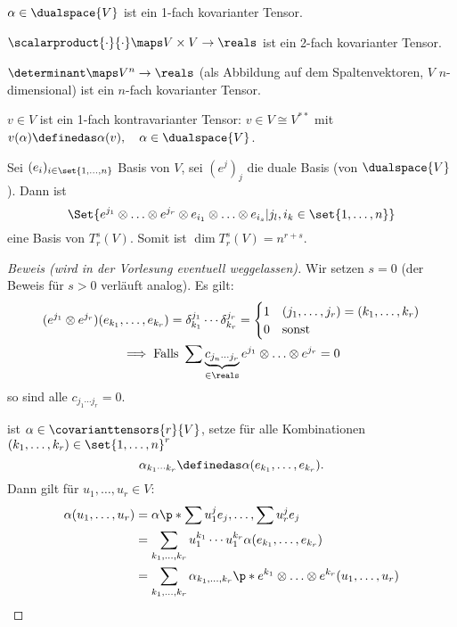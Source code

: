 \begin{beispiel*}
\( \alpha\in \dualspace{V} \) ist ein 1-fach kovarianter Tensor.

\( \scalarproduct{\cdot}{\cdot}\maps V\times V\to\reals \) ist ein 2-fach kovarianter Tensor.

\( \determinant\maps V^n\to\reals \) (als Abbildung auf dem Spaltenvektoren, \( V \) \( n \)-dimensional) ist ein \( n \)-fach kovarianter Tensor.

\( v\in V \) ist ein 1-fach kontravarianter Tensor:
\( v\in V\cong V^{**} \) mit \( v(\alpha)\definedas \alpha(v),\quad \alpha\in \dualspace{V} \).
\end{beispiel*}

\begin{satz}\label{basis_tensorraum}
Sei \( (e_i)_{i\in\set{1,\ldots ,n}} \) Basis von \( V \), sei \( (e^j)_j \) die duale Basis (von \( \dualspace{V} \)).
Dann ist 
\begin{equation*}
    \Set{e^{j_1}\otimes\ldots \otimes e^{j_r}\otimes e_{i_1}\otimes\ldots \otimes e_{i_s}| j_l,i_k\in\set{1,\ldots ,n} }
\end{equation*}
eine Basis von \( T^s_r(V) \).
Somit ist \( \dim T^s_r(V)=n^{r+s} \).    
\end{satz}

\begin{proof}[Beweis (wird in der Vorlesung eventuell weggelassen)]
Wir setzen \( s=0 \) (der Beweis für \( s>0 \) verläuft analog).
Es gilt:
\begin{gather*}
    (e^{j_1}\otimes e^{j_r})(e_{k_1},\ldots ,e_{k_r})=\delta_{k_1}^{j_1}\cdots \delta_{k_r}^{j_r}
    =\begin{cases}
        1 & (j_1,\ldots ,j_r)=(k_1,\ldots ,k_r)\\
        0 & \text{sonst}
    \end{cases}\\
    \implies \text{Falls }\sum \underbrace{c_{j_n\cdots j_r}}_{\in\reals}e^{j_1}\otimes \ldots \otimes e^{j_r}=0
\end{gather*}
so sind alle \( c_{j_1\cdots j_r}=0 \).

ist \( \alpha\in \covarianttensors{r}{V} \), setze für alle Kombinationen \( (k_1,\ldots ,k_r)\in\set{1,\ldots ,n}^r \)
\begin{equation*}
    \alpha_{k_1\cdots k_r}\definedas \alpha(e_{k_1},\ldots ,e_{k_r}).
\end{equation*}
Dann gilt für \( u_1,\ldots ,u_r\in V \):
\begin{align*}
    \alpha(u_1,\ldots ,u_r)&= \alpha\p*{ \sum u_1^j e_j,\ldots ,\sum u_r^j e_j }\\
    &= \sum_{k_1,\ldots ,k_r}u_1^{k_1}\cdots u_1^{k_r}\alpha(e_{k_1},\ldots ,e_{k_r})\\
    &= \sum_{k_1,\ldots ,k_r}\alpha_{k_1,\ldots ,k_r}\p*{ e^{k_1}\otimes \ldots \otimes e^{k_r} }(u_1,\ldots ,u_r)
\end{align*}
\end{proof}

